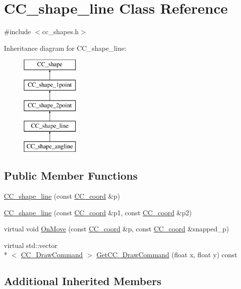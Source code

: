 \hypertarget{a00043}{\section{C\-C\-\_\-shape\-\_\-line Class Reference}
\label{a00043}
}


{\ttfamily \#include $<$cc\-\_\-shapes.\-h$>$}

Inheritance diagram for C\-C\-\_\-shape\-\_\-line\-:\begin{figure}[H]
\begin{center}
\leavevmode
\includegraphics[height=5.000000cm]{a00043}
\end{center}
\end{figure}
\subsection*{Public Member Functions}
\begin{DoxyCompactItemize}
\item 
\hyperlink{a00043_abc7f311d22401f912cfae931aab7ef55}{C\-C\-\_\-shape\-\_\-line} (const \hyperlink{a00029}{C\-C\-\_\-coord} \&p)
\item 
\hyperlink{a00043_ab7a91b050e1d04206ad02279e0c58456}{C\-C\-\_\-shape\-\_\-line} (const \hyperlink{a00029}{C\-C\-\_\-coord} \&p1, const \hyperlink{a00029}{C\-C\-\_\-coord} \&p2)
\item 
virtual void \hyperlink{a00043_a8678d21e42e37bece16b3cac98241d98}{On\-Move} (const \hyperlink{a00029}{C\-C\-\_\-coord} \&p, const \hyperlink{a00029}{C\-C\-\_\-coord} \&snapped\-\_\-p)
\item 
virtual std\-::vector\\*
$<$ \hyperlink{a00031}{C\-C\-\_\-\-Draw\-Command} $>$ \hyperlink{a00043_a65124c0a0a223f45eb151b78c6f38ade}{Get\-C\-C\-\_\-\-Draw\-Command} (float x, float y) const 
\end{DoxyCompactItemize}
\subsection*{Additional Inherited Members}



